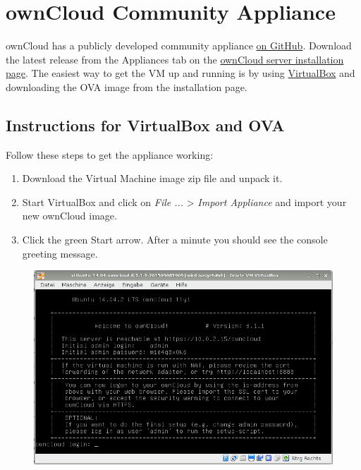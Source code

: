 \documentclass[letterpaper,10pt,english]{sphinxmanual}
\begin{document}
\section{ownCloud Community Appliance}
\label{installation/appliance_installation::doc}\label{installation/appliance_installation:owncloud-community-appliance}
ownCloud has a publicly developed community appliance \href{https://github.com/ownCloud/vm}{on GitHub}. Download the
latest release from the Appliances tab on the \href{https://owncloud.org/install/\#instructions-server}{ownCloud server installation
page}. The easiest way to get the VM up and running is by using \href{https://www.virtualbox.org}{VirtualBox}
and downloading the OVA image from the installation page.


\subsection{Instructions for VirtualBox and OVA}
\label{installation/appliance_installation:instructions-for-virtualbox-and-ova}
Follow these steps to get the appliance working:
\begin{enumerate}
\item {} 
Download the Virtual Machine image zip file and unpack it.

\item {} 
Start VirtualBox and click on \emph{File ...} \textgreater{} \emph{Import Appliance} and import
your new ownCloud image.

\item {} 
Click the green Start arrow. After a minute you should see the console
greeting message.

\end{enumerate}
\begin{figure}[htbp]
\centering

\includegraphics{community-vm-console.png}
\end{figure}
\end{document}
